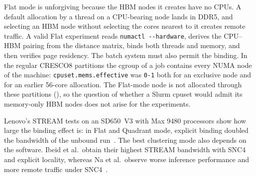 Flat mode is unforgiving because the HBM nodes it creates have no CPUs.
A default allocation by a thread on a CPU-bearing node lands in DDR5, and
selecting an HBM node without selecting the cores nearest to it creates
remote traffic.  A valid Flat experiment reads \texttt{numactl
-{}-hardware}, derives the CPU--HBM pairing from the distance matrix, binds
both threads and memory, and then verifies page residency.  The batch
system must also permit the binding.  In the regular CRESCO8 partitions
the cgroup of a job contains every NUMA node of the machine:
\texttt{cpuset.mems.effective} was \texttt{0-1} both for an exclusive
node and for an earlier 56-core allocation.  The Flat-mode node is not
allocated through these partitions (), so
the question of whether a Slurm cpuset would admit its memory-only HBM
nodes does not arise for the experiments.

Lenovo's STREAM tests on an SD650~V3 with Max 9480 processors show how
large the binding effect is: in Flat and Quadrant mode, explicit binding
doubled the bandwidth of the unbound run~\cite{lp1738}.  The best
clustering mode also depends on the software.  Ibeid et al.\ obtain their
highest STREAM bandwidth with SNC4 and explicit locality, whereas Na et
al.\ observe worse inference performance and more remote traffic under
SNC4~\cite{ibeid2025aurora,na2024llmcpu}.
